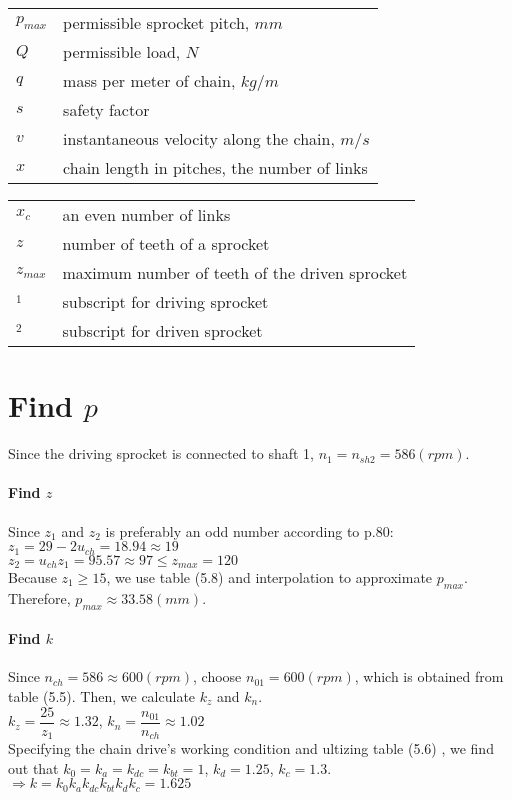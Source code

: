 \begin{tabular}[t]{lp{7cm}}
	$ p_{max} $ & permissible sprocket pitch, $ \unit{mm} $\\
	$ Q $ & permissible load, $ \unit{N} $\\
	$ q $ & mass per meter of chain, $ \unit{kg/m} $\\
	$ s $ & safety factor\\
	$ v $ & instantaneous velocity along the chain, $ \unit{m/s} $\\
	$ x $ & chain length in pitches, the number of links\\
\end{tabular}
\begin{tabular}[t]{lp{7cm}}
	$ x_c $ & an even number of links\\
	$ z $ & number of teeth of a sprocket\\
	$ z_{max} $ & maximum number of teeth of the driven sprocket\\
	$ _1 $  & subscript for driving sprocket\\
	$ _2 $  & subscript for driven sprocket
\end{tabular}

\section{Find $ p $}
Since the driving sprocket is connected to shaft 1, $ n_1 = n_{sh2} = 586\unit{(rpm)} $.

\paragraph{Find $ z $}
Since $ z_1 $ and $ z_2 $ is preferably an odd number according to p.80:\\
$ z_1 = 29 - 2u_{ch} = 18.94 \approx 19$\\
$ z_2 = u_{ch}z_1 = 95.57 \approx 97 \leq z_{max} = 120$\\
Because $ z_1 \geq 15 $, we use table (5.8) and interpolation to approximate $ p_{max} $. Therefore, $ p_{max} \approx 33.58 \unit{(mm)} $.

\paragraph{Find $ k $}
Since $ n_{ch} = 586 \approx 600 \unit{(rpm)}$, choose $ n_{01} = 600\unit{(rpm)} $, which is obtained from table (5.5). Then, we calculate $ k_z $ and $ k_n $.\\
$ k_z = \dfrac{25}{z_1} \approx 1.32$, 
$ k_n = \dfrac{n_{01}}{n_{ch}} \approx 1.02$\\
Specifying the chain drive's working condition and ultizing table (5.6) , we find out that $ k_0=k_a=k_{dc}=k_{bt}=1 $, $ k_d=1.25 $, $ k_c=1.3 $.\\
$\Rightarrow k = k_0k_ak_{dc}k_{bt}k_dk_c = 1.625$

